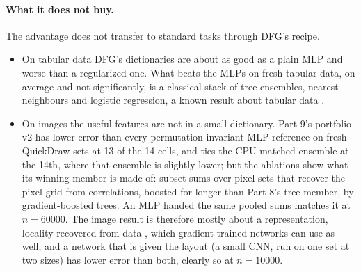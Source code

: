 \paragraph{What it does not buy.} The advantage does not transfer to standard tasks through DFG's recipe.
\begin{itemize}
\item On tabular data DFG's dictionaries are about as good as a plain MLP and worse than a regularized one. What beats the MLPs on fresh tabular data, on average and not significantly, is a classical stack of tree ensembles, nearest neighbours and logistic regression, a known result about tabular data \cite{grinsztajn2022tree,shwartzziv2022tabular}.
\item On images the useful features are not in a small dictionary. Part 9's portfolio v2 has lower error than every permutation-invariant MLP reference on fresh QuickDraw sets at 13 of the 14 cells, and ties the CPU-matched ensemble at the 14th, where that ensemble is slightly lower; but the ablations show what its winning member is made of: subset sums over pixel sets that recover the pixel grid from correlations, boosted for longer than Part 8's tree member, by gradient-boosted trees. An MLP handed the same pooled sums matches it at $n=60000$. The image result is therefore mostly about a representation, locality recovered from data \cite{leroux2007topology,coates2011receptive}, which gradient-trained networks can use as well, and a network that is given the layout (a small CNN, run on one set at two sizes) has lower error than both, clearly so at $n=10000$.
\end{itemize}

